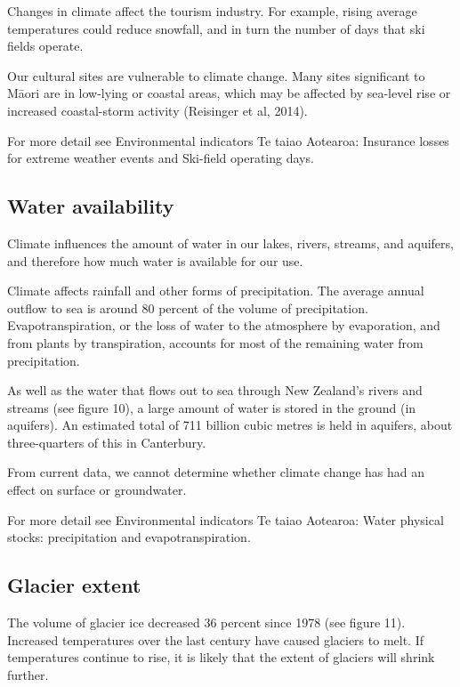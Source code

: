 \documentclass[11pt]{article} %
\begin{document}
Changes in climate affect the tourism industry. For example, rising average temperatures could reduce snowfall, and in turn the number of days that ski fields operate.

Our cultural sites are vulnerable to climate change. Many sites significant to Māori are in low-lying or coastal areas, which may be affected by sea-level rise or increased coastal-storm activity (Reisinger et al, 2014).

For more detail see Environmental indicators Te taiao Aotearoa: Insurance losses for extreme weather events and Ski-field operating days.

\subsection{Water availability}
Climate influences the amount of water in our lakes, rivers, streams, and aquifers, and therefore how much water is available for our use.

Climate affects rainfall and other forms of precipitation. The average annual outflow to sea is around 80 percent of the volume of precipitation. Evapotranspiration, or the loss of water to the atmosphere by evaporation, and from plants by transpiration, accounts for most of the remaining water from precipitation.

As well as the water that flows out to sea through New Zealand’s rivers and streams (see figure 10), a large amount of water is stored in the ground (in aquifers). An estimated total of 711 billion cubic metres is held in aquifers, about three-quarters of this in Canterbury.


From current data, we cannot determine whether climate change has had an effect on surface or groundwater.

For more detail see Environmental indicators Te taiao Aotearoa: Water physical stocks: precipitation and evapotranspiration.

\subsection{Glacier extent}
The volume of glacier ice decreased 36 percent since 1978 (see figure 11). Increased temperatures over the last century have caused glaciers to melt. If temperatures continue to rise, it is likely that the extent of glaciers will shrink further.

\end{document}
